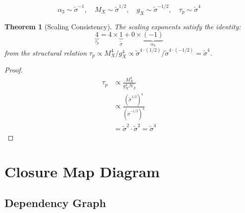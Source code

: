 \documentclass[11pt,letterpaper]{article}
\newtheorem{theorem}{Theorem}[section]
\newcommand{\st}{\tilde{\sigma}}
\newcommand{\Hp}{\mathcal{H}_p}
\begin{document}
\begin{equation}
\alpha_3 \sim \st^{-1}, \quad M_X \sim \st^{1/2}, \quad g_X \sim \st^{-1/2}, \quad \tau_p \sim \st^{4}
\label{eq:scaling-summary}
\end{equation}

\begin{theorem}[Scaling Consistency]
\label{thm:scaling-consistency}
The scaling exponents satisfy the identity:
\begin{equation}
\underbrace{4}_{\tau_p} = 4 \times \underbrace{1}_{\st} + 0 \times \underbrace{(-1)}_{\alpha_3}
\label{eq:scaling-identity}
\end{equation}
from the structural relation $\tau_p \propto M_X^4/g_X^4 \propto \st^{4\cdot(1/2)}/\st^{4\cdot(-1/2)} = \st^4$.
\end{theorem}

\begin{proof}
\begin{align}
\tau_p &\propto \frac{M_X^4}{g_X^4 \Hp} \label{eq:taup-structure} \\
&\propto \frac{(\st^{1/2})^4}{(\st^{-1/2})^4} \label{eq:scaling-sub} \\
&= \st^2 \cdot \st^2 = \st^4 \label{eq:scaling-result}
\end{align}
\end{proof}

\section{Closure Map Diagram}
\label{sec:closure-map}

\subsection{Dependency Graph}
\label{subsec:dep-graph}
\end{document}

